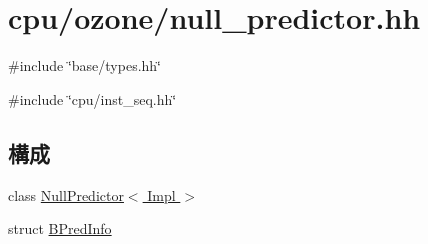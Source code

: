 \hypertarget{null__predictor_8hh}{
\section{cpu/ozone/null\_\-predictor.hh}
\label{null__predictor_8hh}
}
{\ttfamily \#include \char`\"{}base/types.hh\char`\"{}}\par
{\ttfamily \#include \char`\"{}cpu/inst\_\-seq.hh\char`\"{}}\par
\subsection*{構成}
\begin{DoxyCompactItemize}
\item 
class \hyperlink{classNullPredictor}{NullPredictor$<$ Impl $>$}
\item 
struct \hyperlink{structNullPredictor_1_1BPredInfo}{BPredInfo}
\end{DoxyCompactItemize}

